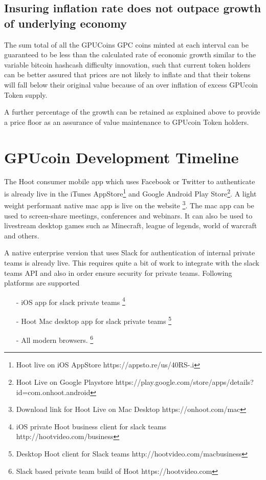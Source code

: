 \documentclass{article}
\begin{document}
\subsection{Insuring inflation rate does not outpace growth of underlying economy}
The sum total of all the GPUCoins GPC coins minted at each interval can be guaranteed to be less than the calculated rate of economic growth similar to the variable bitcoin hashcash difficulty innovation, such that current token holders can be better assured that prices are not likely to inflate and that their tokens will fall below their original value because of an over inflation of excess GPUcoin Token supply.

A further percentage of the growth can be retained as explained above to provide a price floor as an assurance of value maintenance to GPUcoin Token holders. 

\section{GPUcoin Development Timeline}
The Hoot consumer mobile app which uses Facebook or Twitter to authenticate is already live in the iTunes AppStore\footnote{Hoot live on iOS AppStore https://appsto.re/us/40RS-.i} and Google Android Play Store\footnote{Hoot Live on Google Playstore https://play.google.com/store/apps/details?id=com.onhoot.android}.
A light weight performant native mac app is live on
the website \footnote{Download link for Hoot Live on Mac Desktop https://onhoot.com/mac}. The mac app can be used to screen-share meetings, conferences and webinars. It can also be used to livestream desktop games such as Minecraft, league of legends, world of warcraft and others.

A native enterprise version that uses Slack for authentication of internal private teams is already live.
 This requires quite a bit of work to integrate with the slack teams API and also in order ensure security for private teams. Following platforms are supported
\begin{itemize}

\item[-]iOS app for slack private teams \footnote{ iOS private Hoot business client for slack teams http://hootvideo.com/business}
\item[-]Hoot Mac desktop app for slack private teams \footnote{Desktop Hoot client for Slack teams http://hootvideo.com/macbusiness}
\item[-]All modern browsers. \footnote{Slack based private team build of Hoot https://hootvideo.com}
\end{itemize}
\end{document}
